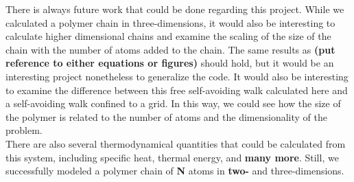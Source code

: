 \documentclass{article}
\begin{document}
\begin{multicols}{2}
There is always future work that could be done regarding this project.  While we calculated a polymer chain in three-dimensions, it would also be interesting to calculate higher dimensional chains and examine the scaling of the size of the chain with the number of atoms added to the chain.  The same results as \textbf{(put reference to either equations or figures)} should hold, but it would be an interesting project nonetheless to generalize the code.  It would also be interesting to examine the difference between this free self-avoiding walk calculated here and a self-avoiding walk confined to a grid.  In this way, we could see how the size of the polymer is related to the number of atoms and the dimensionality of the problem.  \\

There are also several thermodynamical quantities that could be calculated from this system, including specific heat, thermal energy, and \textbf{many more}.  Still, we successfully modeled a polymer chain of \textbf{N} atoms in \textbf{two-} and three-dimensions.  

\end{multicols}


\end{document}
